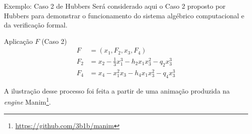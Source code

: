 \begin{frame}{Exemplo: Caso 2 de Hubbers}
    Será considerado aqui o Caso 2 proposto por Hubbers para demonstrar o funcionamento do sistema algébrico computacional e da verificação formal.
    
    \vspace{0.2cm}

    \begin{block}{Aplicação $F$ (Caso 2)}
        \vspace{-0.4cm} 
        \begin{align*}
            F &= (x_1, F_2, x_3, F_4) \\
            F_2 &= x_2 - \frac{1}{3} x_1^3 - h_2 x_1 x_3^2 - q_2 x_3^3 \\
            F_4 &= x_4 - x_1^2 x_3 - h_4 x_1 x_3^2 - q_4 x_3^3
        \end{align*}
    \end{block}
    \vfill
    A ilustração desse processo foi feita a partir de uma animação produzida na \textit{engine} Manim\footnote{\url{https://github.com/3b1b/manim}}.
\end{frame}